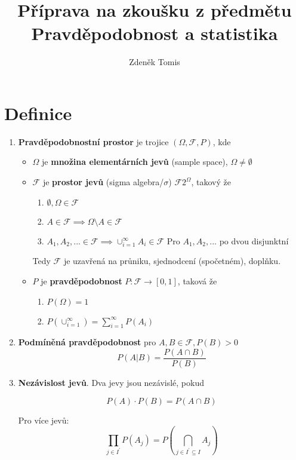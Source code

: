 \documentclass[10pt,a4paper]{article}
\title{Příprava na zkoušku z předmětu Pravděpodobnost a statistika}
\author{Zdeněk Tomis}
\date{}
\theoremstyle{plain}
\theoremstyle{definition}
\begin{document}
\maketitle

\section{Definice}

\begin{enumerate}
\item \textbf{Pravděpodobnostní prostor} je trojice $(\Omega, \mathcal{F}, P)$, kde

\begin{itemize}
\item $\Omega$ je \textbf{množina elementárních jevů} (sample space), $\Omega \neq \emptyset$
\item $\mathcal{F}$ je \textbf{prostor jevů} (sigma algebra/$\sigma$) $\mathcal{F} 2^\Omega$, takový že
\begin{enumerate}
\item $\emptyset, \Omega \in \mathcal{F} $
\item $A \in \mathcal{F} \implies \Omega \setminus A \in \mathcal{F}$
\item $A_1, A_2, ... \in \mathcal{F} \implies \cup^\infty_{i=1} A_i \in \mathcal{F}$ Pro $A_1, A_2, ...$ po dvou disjunktní
\end{enumerate}

Tedy $\mathcal{F}$ je uzavřená na průniku, sjednodcení (spočetném), doplňku.
\item $P$ je \textbf{pravděpodobnost}  $P: \mathcal{F} \to [0,1]$, taková že
\begin{enumerate}
\item $P(\Omega) = 1$
\item $P(\cup^\infty_{i=1}) = \sum^\infty_{i=1} P(A_i)$
\end{enumerate}
\end{itemize}

\item \textbf{Podmíněná pravděpodobnost} pro $A,B \in \mathcal{F}, P(B) > 0$
\[P(A|B) = \frac{P(A \cap B)}{P(B)}\]

\item \textbf{Nezávislost jevů}. Dva jevy jsou nezávislé, pokud 

\[P(A) \cdot P(B) = P(A\cap B)\]

Pro více jevů:
\[\prod_{j \in I^\prime} P(A_j) = P\left( \bigcap_{j \in I^\prime \subseteq I} A_j\right)\]


\end{enumerate}
\end{document}
